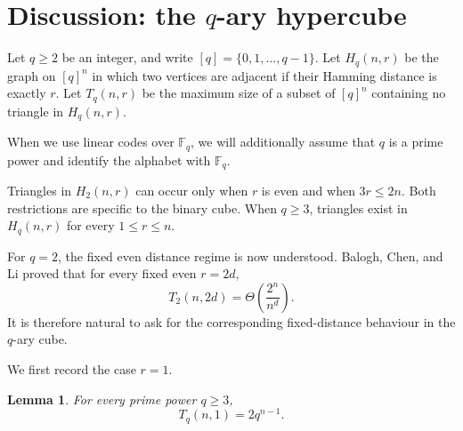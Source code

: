 \documentclass[11pt]{article}
\theoremstyle{plain}
\newtheorem{lemma}{Lemma}
\newcommand{\F}{\mathbb{F}}
\begin{document}
\section{Discussion: the $q$-ary hypercube}\label{sec:qary}

Let $q\ge2$ be an integer, and write $[q]=\{0,1,\ldots,q-1\}$.
Let $H_q(n,r)$ be the graph on $[q]^n$ in which two vertices are
adjacent if their Hamming distance is exactly $r$. Let $T_q(n,r)$
be the maximum size of a subset of $[q]^n$ containing no triangle
in $H_q(n,r)$.

When we use linear codes over $\F_q$, we will additionally assume
that $q$ is a prime power and identify the alphabet with $\F_q$.

Triangles in $H_2(n,r)$ can occur only when $r$ is even and when
$3r\le 2n$.
Both restrictions are specific to the binary cube.
When $q\ge 3$, triangles exist in $H_q(n,r)$ for every $1\le r\le n$.

For $q=2$, the fixed even distance regime is now understood.
Balogh, Chen, and Li proved \cite{balogh} that for every fixed even
$r=2d$,
\[
T_2(n,2d)=\Theta\!\left(\frac{2^n}{n^d}\right).
\]
It is therefore natural to ask for the corresponding fixed-distance
behaviour in the $q$-ary cube.

We first record the case $r=1$.

\begin{lemma}
For every prime power $q\ge 3$,
\[
T_q(n,1)=2q^{n-1}.
\]
\end{lemma}
\end{document}
